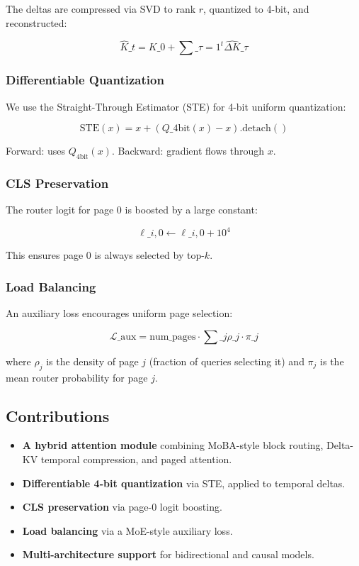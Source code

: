 The deltas are compressed via SVD to rank $r$, quantized to 4-bit, and 
reconstructed:

\[
\hat{K}\_t = K\_0 + \sum\_{\tau=1}^t \widehat{\Delta K}\_\tau
\tag{1.4}
\]

\subsubsection{Differentiable Quantization}

We use the Straight-Through Estimator (STE) for 4-bit uniform quantization:

\[
\text{STE}(x) = x + (Q\_{4\text{bit}}(x) - x).\text{detach}()
\tag{1.5}
\]

Forward: uses $Q_{4\text{bit}}(x)$. Backward: gradient flows through $x$.

\subsubsection{CLS Preservation}

The router logit for page 0 is boosted by a large constant:

\[
\ell\_{i, 0} \leftarrow \ell\_{i, 0} + 10^4
\tag{1.6}
\]

This ensures page 0 is always selected by top-$k$.

\subsubsection{Load Balancing}

An auxiliary loss encourages uniform page selection:

\[
\mathcal{L}\_\text{aux} = \text{num\_pages} \cdot \sum\_{j} \rho\_j \cdot \pi\_j
\tag{1.7}
\]

where $\rho_j$ is the density of page $j$ (fraction of queries selecting it) 
and $\pi_j$ is the mean router probability for page $j$.

\subsection{Contributions}

\begin{itemize}
\item \textbf{A hybrid attention module} combining MoBA-style block routing, Delta-KV
  temporal compression, and paged attention.
\item \textbf{Differentiable 4-bit quantization} via STE, applied to temporal deltas.
\item \textbf{CLS preservation} via page-0 logit boosting.
\item \textbf{Load balancing} via a MoE-style auxiliary loss.
\item \textbf{Multi-architecture support} for bidirectional and causal models.

\end{itemize}
